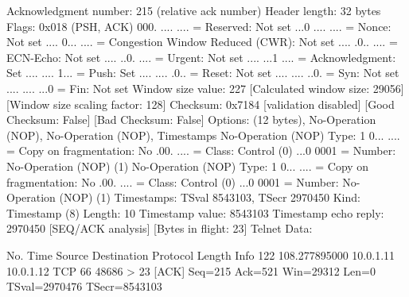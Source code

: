     Acknowledgment number: 215    (relative ack number)
    Header length: 32 bytes
    Flags: 0x018 (PSH, ACK)
        000. .... .... = Reserved: Not set
        ...0 .... .... = Nonce: Not set
        .... 0... .... = Congestion Window Reduced (CWR): Not set
        .... .0.. .... = ECN-Echo: Not set
        .... ..0. .... = Urgent: Not set
        .... ...1 .... = Acknowledgment: Set
        .... .... 1... = Push: Set
        .... .... .0.. = Reset: Not set
        .... .... ..0. = Syn: Not set
        .... .... ...0 = Fin: Not set
    Window size value: 227
    [Calculated window size: 29056]
    [Window size scaling factor: 128]
    Checksum: 0x7184 [validation disabled]
        [Good Checksum: False]
        [Bad Checksum: False]
    Options: (12 bytes), No-Operation (NOP), No-Operation (NOP), Timestamps
        No-Operation (NOP)
            Type: 1
                0... .... = Copy on fragmentation: No
                .00. .... = Class: Control (0)
                ...0 0001 = Number: No-Operation (NOP) (1)
        No-Operation (NOP)
            Type: 1
                0... .... = Copy on fragmentation: No
                .00. .... = Class: Control (0)
                ...0 0001 = Number: No-Operation (NOP) (1)
        Timestamps: TSval 8543103, TSecr 2970450
            Kind: Timestamp (8)
            Length: 10
            Timestamp value: 8543103
            Timestamp echo reply: 2970450
    [SEQ/ACK analysis]
        [Bytes in flight: 23]
Telnet
    Data: 

No.     Time           Source                Destination           Protocol Length Info
    122 108.277895000  10.0.1.11             10.0.1.12             TCP      66     48686 > 23 [ACK] Seq=215 Ack=521 Win=29312 Len=0 TSval=2970476 TSecr=8543103

